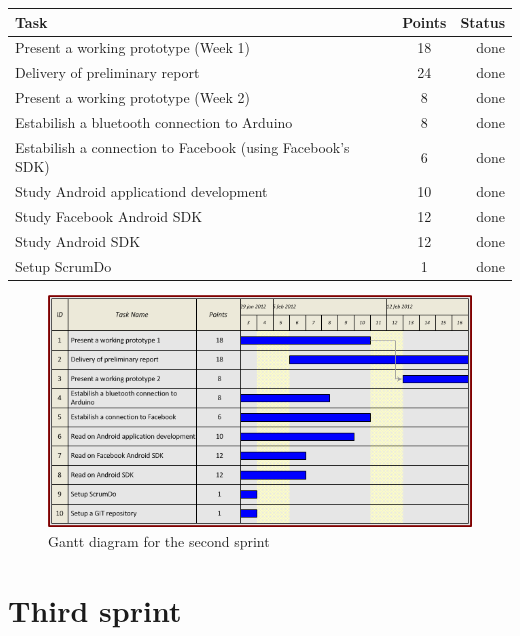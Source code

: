 \begin{table}[ht!]
\begin{tabular}{ | l | c | r | }

\hline
\textbf{Task} & \textbf{Points} & \textbf{Status} \\
\hline

Present a working prototype	(Week 1)	& 18 & done \\
\hline
Delivery of preliminary report			& 24 & done \\
\hline
Present a working prototype	(Week 2)	& 8  & done \\
\hline
Estabilish a bluetooth connection to Arduino	& 8  & done \\
\hline
Estabilish a connection to Facebook
(using Facebook's SDK)				& 6  & done \\
\hline
Study Android applicationd development		& 10 & done \\
\hline
Study Facebook Android SDK			& 12 & done \\
\hline
Study Android SDK				& 12 & done \\
\hline
Setup ScrumDo					& 1  & done \\
\hline

\end{tabular}
\end{table}

\begin{figure}[h!]
\centering \includegraphics[scale=0.8]{img/sprints-gantt2.png}
\caption{Gantt diagram for the second sprint}
\label{fig:sprints-gantt2}
\end{figure}

\newpage

\section{Third sprint}

